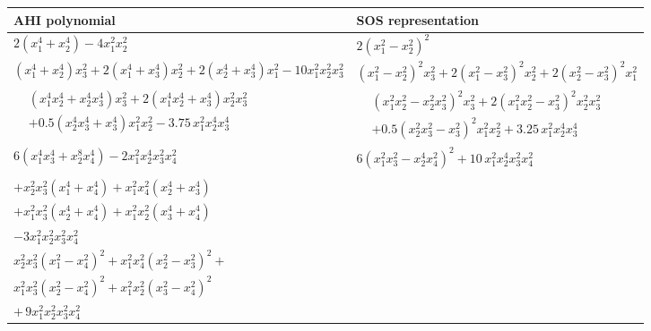 \documentclass[12pt]{elsarticle}
\theoremstyle{definition}
\begin{document}
\begin{table}[h!]
    \centering
    \renewcommand{\arraystretch}{2.2}
    \begin{tabular}{|p{7cm}|p{7cm}|}
    \hline
     \textbf{AHI polynomial}  & \textbf{SOS representation} \\
    \hline

    $2(x_1^4 + x_2^4) - 4x_1^2 x_2^2$
    &
    $2(x_1^2 - x_2^2)^2$
    \\ \hline

    $(x_1^4+x_2^4)x_3^2 + 2(x_1^4+x_3^4)x_2^2 + 2(x_2^4+x_3^4)x_1^2 - 10x_1^2 x_2^2 x_3^2$
    &
    $(x_1^2-x_2^2)^2 x_3^2 + 2(x_1^2-x_3^2)^2 x_2^2 + 2(x_2^2-x_3^2)^2 x_1^2$
    \\ \hline

    $
    \begin{aligned}
    & (x_1^4x_2^4 + x_2^4x_3^4)x_3^2
     + 2(x_1^4x_2^4 + x_3^4)x_2^2x_3^2 \\
    & + 0.5(x_2^4x_3^4 + x_3^4)x_1^2x_2^2
     - 3.75\, x_1^2 x_2^4 x_3^4
    \end{aligned}
    $
    &
    $
    \begin{aligned}
    & (x_1^2x_2^2 - x_2^2x_3^2)^2 x_3^2
     + 2(x_1^2x_2^2 - x_3^2)^2 x_2^2x_3^2 \\
    & + 0.5(x_2^2x_3^2 - x_3^2)^2 x_1^2x_2^2
     + 3.25\, x_1^2 x_2^4 x_3^4
    \end{aligned}
    $
    \\ \hline

    $6(x_1^4 x_3^4 + x_2^8 x_4^4) - 2 x_1^2 x_2^4 x_3^2 x_4^2$
    &
    $6(x_1^2 x_3^2 - x_2^4 x_4^2)^2 + 10\, x_1^2 x_2^4 x_3^2 x_4^2$
    \\ \hline

    \begin{minipage}{7cm}
\vspace{5pt}
$x_3^2 x_4^2 (x_1^4 + x_2^4) + x_2^2 x_4^2 (x_1^4 + x_3^4)$ \\
$+ x_2^2 x_3^2 (x_1^4 + x_4^4) + x_1^2 x_4^2 (x_2^4 + x_3^4)$ \\
$+ x_1^2 x_3^2 (x_2^4 + x_4^4) + x_1^2 x_2^2 (x_3^4 + x_4^4)$ \\
$- 3 x_1^2 x_2^2 x_3^2 x_4^2$
\vspace{5pt}
\end{minipage} &
\begin{minipage}{7cm}
\vspace{5pt}
$x_3^2 x_4^2 (x_1^2 - x_2^2)^2 +
x_2^2 x_4^2 (x_1^2 - x_3^2)^2 +$ \\
$ x_2^2 x_3^2 (x_1^2 - x_4^2)^2 +
x_1^2 x_4^2 (x_2^2 - x_3^2)^2 +$ \\
$ x_1^2 x_3^2 (x_2^2 - x_4^2)^2 +
x_1^2 x_2^2 (x_3^2 - x_4^2)^2$ \\
$+\,9 x_1^2 x_2^2 x_3^2 x_4^2$
\vspace{5pt}
\end{minipage} \\ \hline


\end{tabular}
\end{table}
\end{document}
